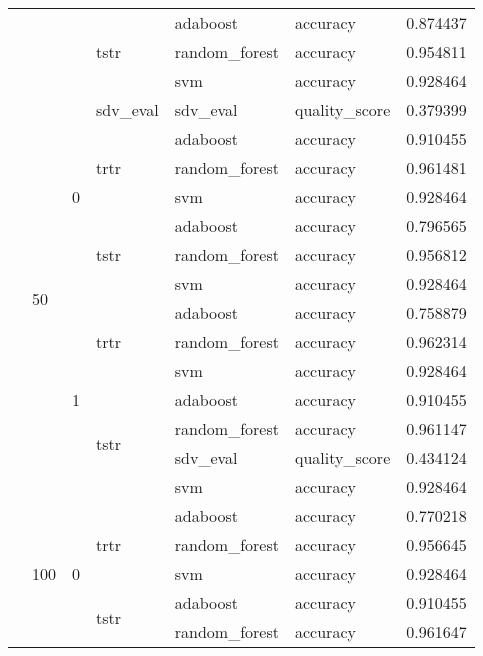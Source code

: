 \begin{longtable}{llllllr}
\cline{4-7} \cline{5-7}
 &  &  & \multirow[t]{3}{*}{tstr} & adaboost & accuracy & 0.874437 \\
\cline{5-7}
 &  &  &  & random_forest & accuracy & 0.954811 \\
\cline{5-7}
 &  &  &  & svm & accuracy & 0.928464 \\
\cline{2-7} \cline{3-7} \cline{4-7} \cline{5-7}
 & \multirow[t]{14}{*}{50} & \multirow[t]{7}{*}{0} & sdv_eval & sdv_eval & quality_score & 0.379399 \\
\cline{4-7} \cline{5-7}
 &  &  & \multirow[t]{3}{*}{trtr} & adaboost & accuracy & 0.910455 \\
\cline{5-7}
 &  &  &  & random_forest & accuracy & 0.961481 \\
\cline{5-7}
 &  &  &  & svm & accuracy & 0.928464 \\
\cline{4-7} \cline{5-7}
 &  &  & \multirow[t]{3}{*}{tstr} & adaboost & accuracy & 0.796565 \\
\cline{5-7}
 &  &  &  & random_forest & accuracy & 0.956812 \\
\cline{5-7}
 &  &  &  & svm & accuracy & 0.928464 \\
\cline{3-7} \cline{4-7} \cline{5-7}
 &  & \multirow[t]{7}{*}{1} & \multirow[t]{3}{*}{trtr} & adaboost & accuracy & 0.758879 \\
\cline{5-7}
 &  &  &  & random_forest & accuracy & 0.962314 \\
\cline{5-7}
 &  &  &  & svm & accuracy & 0.928464 \\
\cline{4-7} \cline{5-7}
 &  &  & \multirow[t]{4}{*}{tstr} & adaboost & accuracy & 0.910455 \\
\cline{5-7}
 &  &  &  & random_forest & accuracy & 0.961147 \\
\cline{5-7}
 &  &  &  & sdv_eval & quality_score & 0.434124 \\
\cline{5-7}
 &  &  &  & svm & accuracy & 0.928464 \\
\cline{2-7} \cline{3-7} \cline{4-7} \cline{5-7}
 & \multirow[t]{14}{*}{100} & \multirow[t]{7}{*}{0} & \multirow[t]{3}{*}{trtr} & adaboost & accuracy & 0.770218 \\
\cline{5-7}
 &  &  &  & random_forest & accuracy & 0.956645 \\
\cline{5-7}
 &  &  &  & svm & accuracy & 0.928464 \\
\cline{4-7} \cline{5-7}
 &  &  & \multirow[t]{4}{*}{tstr} & adaboost & accuracy & 0.910455 \\
\cline{5-7}
 &  &  &  & random_forest & accuracy & 0.961647 \\

\end{longtable}
